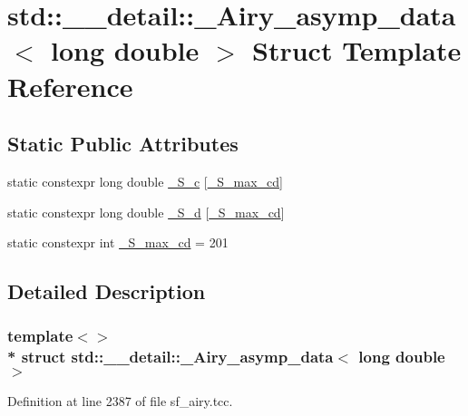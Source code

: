 \hypertarget{structstd_1_1____detail_1_1__Airy__asymp__data_3_01long_01double_01_4}{}\section{std\+:\+:\+\_\+\+\_\+detail\+:\+:\+\_\+\+Airy\+\_\+asymp\+\_\+data$<$ long double $>$ Struct Template Reference}
\label{structstd_1_1____detail_1_1__Airy__asymp__data_3_01long_01double_01_4}
\subsection*{Static Public Attributes}
\begin{DoxyCompactItemize}
\item 
static constexpr long double \hyperlink{structstd_1_1____detail_1_1__Airy__asymp__data_3_01long_01double_01_4_a563bbe7d1ef612defb41aaedcc5657fe}{\+\_\+\+S\+\_\+c} \mbox{[}\hyperlink{structstd_1_1____detail_1_1__Airy__asymp__data_3_01long_01double_01_4_a6a21ac69ffc53d33ebc346981bc52b9a}{\+\_\+\+S\+\_\+max\+\_\+cd}\mbox{]}
\item 
static constexpr long double \hyperlink{structstd_1_1____detail_1_1__Airy__asymp__data_3_01long_01double_01_4_a3c49ca222e675f3def5077e46c7d6834}{\+\_\+\+S\+\_\+d} \mbox{[}\hyperlink{structstd_1_1____detail_1_1__Airy__asymp__data_3_01long_01double_01_4_a6a21ac69ffc53d33ebc346981bc52b9a}{\+\_\+\+S\+\_\+max\+\_\+cd}\mbox{]}
\item 
static constexpr int \hyperlink{structstd_1_1____detail_1_1__Airy__asymp__data_3_01long_01double_01_4_a6a21ac69ffc53d33ebc346981bc52b9a}{\+\_\+\+S\+\_\+max\+\_\+cd} = 201
\end{DoxyCompactItemize}


\subsection{Detailed Description}
\subsubsection*{template$<$$>$\\*
struct std\+::\+\_\+\+\_\+detail\+::\+\_\+\+Airy\+\_\+asymp\+\_\+data$<$ long double $>$}



Definition at line 2387 of file sf\+\_\+airy.\+tcc.



